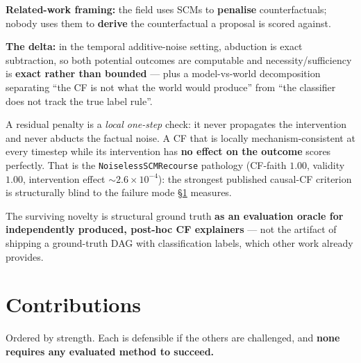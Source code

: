 \documentclass[11pt]{article}
\begin{document}
\noindent\textbf{Related-work framing:} the field uses SCMs to
\textbf{penalise} counterfactuals; nobody uses them to \textbf{derive} the
counterfactual a proposal is scored against.

\noindent\textbf{The delta:} in the temporal additive-noise setting,
abduction is exact subtraction, so both potential outcomes are computable
and necessity/sufficiency is \textbf{exact rather than bounded} --- plus a
model-vs-world decomposition separating ``the CF is not what the world
would produce'' from ``the classifier does not track the true label
rule''.

A residual penalty is a \emph{local one-step} check: it never propagates
the intervention and never abducts the factual noise. A CF that is locally
mechanism-consistent at every timestep while its intervention has
\textbf{no effect on the outcome} scores perfectly. That is the
\texttt{NoiselessSCMRecourse} pathology (CF-faith $1.00$, validity $1.00$,
intervention effect $\sim 2.6{\times}10^{-4}$): the strongest published
causal-CF criterion is structurally blind to the failure mode
\S\ref{sec:contrib} measures.

The surviving novelty is structural ground truth \textbf{as an evaluation
oracle for independently produced, post-hoc CF explainers} --- not the
artifact of shipping a ground-truth DAG with classification labels, which
other work already provides.

\section{Contributions}
\label{sec:contrib}

Ordered by strength. Each is defensible if the others are challenged, and
\textbf{none requires any evaluated method to succeed.}
\end{document}
